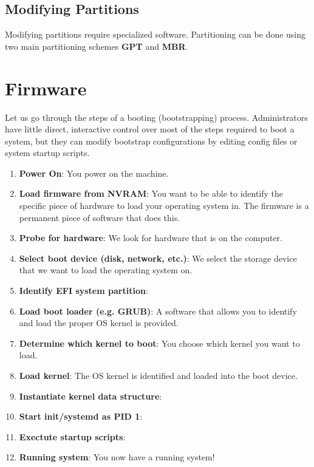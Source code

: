 \documentclass{article}
\theoremstyle{definition}
\begin{document}
  \subsection{Modifying Partitions} 
    
    Modifying partitions require specialized software. Partitioning can be done using two main partitioning schemes \textbf{GPT} and \textbf{MBR}. 

\section{Firmware} 

  Let us go through the steps of a booting (bootstrapping) process. Administrators have little direct, interactive control over most of the steps required to boot a system, but they can modify bootstrap configurations by editing config files or system startup scripts. 

  \begin{enumerate}
    \item \textbf{Power On}: You power on the machine. 
    \item \textbf{Load firmware from NVRAM}: You want to be able to identify the specific piece of hardware to load your operating system in. The firmware is a permanent piece of software that does this. 
    \item \textbf{Probe for hardware}: We look for hardware that is on the computer. 
    \item \textbf{Select boot device (disk, network, etc.)}: We select the storage device that we want to load the operating system on. 
    \item \textbf{Identify EFI system partition}: 
    \item \textbf{Load boot loader (e.g. GRUB)}: A software that allows you to identify and load the proper OS kernel is provided. 
    \item \textbf{Determine which kernel to boot}: You choose which kernel you want to load.  
    \item \textbf{Load kernel}: The OS kernel is identified and loaded into the boot device. 
    \item \textbf{Instantiate kernel data structure}: 
    \item \textbf{Start init/systemd as PID 1}: 
    \item \textbf{Exectute startup scripts}:
    \item \textbf{Running system}: You now have a running system! 
  \end{enumerate}
\end{document}
